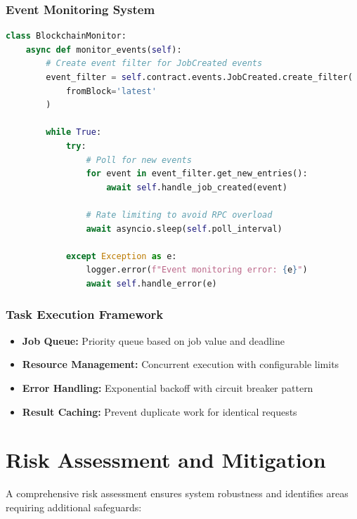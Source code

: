 \subsubsection{Event Monitoring System}
\begin{lstlisting}[language=Python, caption=Asynchronous blockchain event monitoring]
class BlockchainMonitor:
    async def monitor_events(self):
        # Create event filter for JobCreated events
        event_filter = self.contract.events.JobCreated.create_filter(
            fromBlock='latest'
        )
        
        while True:
            try:
                # Poll for new events
                for event in event_filter.get_new_entries():
                    await self.handle_job_created(event)
                    
                # Rate limiting to avoid RPC overload
                await asyncio.sleep(self.poll_interval)
                
            except Exception as e:
                logger.error(f"Event monitoring error: {e}")
                await self.handle_error(e)
\end{lstlisting}

\subsubsection{Task Execution Framework}
\begin{itemize}
    \item \textbf{Job Queue:} Priority queue based on job value and deadline
    \item \textbf{Resource Management:} Concurrent execution with configurable limits
    \item \textbf{Error Handling:} Exponential backoff with circuit breaker pattern
    \item \textbf{Result Caching:} Prevent duplicate work for identical requests
\end{itemize}

\section{Risk Assessment and Mitigation}

A comprehensive risk assessment ensures system robustness and identifies areas requiring additional safeguards:

